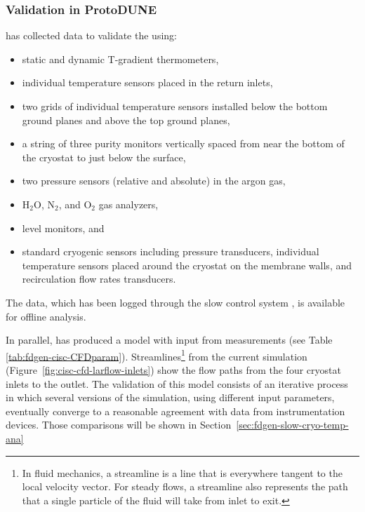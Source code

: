 \subsubsection{Validation in ProtoDUNE}
\label{sec:cfdvalid}
 has collected data to validate the  using: %
\begin{itemize}
\item static and dynamic T-gradient thermometers, 
\item individual temperature sensors placed in the return  inlets, 
\item two \twod grids of individual temperature sensors installed below the bottom ground planes and above the top ground planes, 
\item a string of three purity monitors vertically spaced from near the bottom of the cryostat to just below the  surface,
\item two pressure sensors (relative and absolute) in the argon gas,
\item H$_{2}$O, N$_{2}$, and O$_{2}$ gas analyzers, 
\item {} level monitors, and
\item standard cryogenic sensors including pressure transducers, individual temperature sensors placed around
the cryostat on the membrane walls, and recirculation flow rates transducers.
\end{itemize}


The data, which has been logged through the  slow control system \cite{pdspdcs_proc}, is available for offline analysis. %

In parallel,  has produced a   model %
with input from  measurements (see Table  \ref{tab:fdgen-cisc-CFDparam}). Streamlines\footnote{In fluid mechanics, a streamline is a line that is everywhere tangent to the local velocity vector. For steady flows, a streamline also represents the path that a single particle of the fluid will take from inlet to exit.} from the current  simulation (Figure~\ref{fig:cisc-cfd-larflow-inlets}) show the flow paths from the four cryostat inlets to the outlet. The validation of this model consists of an iterative process in which several versions of the  simulation, using different input parameters, eventually %
converge %
to a reasonable agreement with data from instrumentation devices. Those comparisons will be shown in Section~\ref{sec:fdgen-slow-cryo-temp-ana}


